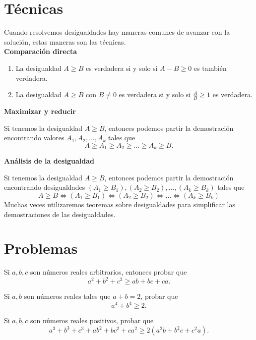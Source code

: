 \documentclass[12pt]{article}
\begin{document}
    \section{Técnicas}
    Cuando resolvemos desigualdades hay maneras comunes de avanzar con la solución, estas maneras son las técnicas.\\

    \textbf{Comparación directa}
    \begin{enumerate}
        \item La desigualdad $A \geq B$ es verdadera si y solo si $A - B \geq 0$ es también verdadera.
        \item La desigualdad $A \geq B$ con $B \neq 0$ es verdadera si y solo si $\frac{A}{B} \geq 1$ es verdadera.
    \end{enumerate}

    \textbf{Maximizar y reducir}
    \par
    Si tenemos la desigualdad $A \geq B$, entonces podemos partir la demostración encontrando valores $A_1, A_2, \ldots, A_k$ tales que
    \[
        A \geq A_1 \geq A_2 \geq \ldots \geq A_k \geq B.
    \]

    \textbf{Análisis de la desigualdad}
    \par
    Si tenemos la desigualdad $A \geq B$, entonces podemos partir la demostración encontrando desigualdades $(A_1 \geq B_1), (A_2 \geq B_2), \ldots, (A_k \geq B_k)$ tales que
    \[
       A \geq B \iff (A_1 \geq B_1) \iff (A_2 \geq B_2) \iff \ldots \iff (A_k \geq B_k)
    \]
    Muchas veces utilizaremos teoremas sobre desigualdades para simplificar las demostraciones de las desigualdades.

    \section{Problemas}

    \begin{prob-without-section}
        Si $a,b,c$ son números reales arbitrarios, entonces probar que
        \[
            a^2 + b^2 + c^2 \geq ab + bc + ca.
        \]
    \end{prob-without-section}

    \begin{prob-without-section}
        Si $a,b$ son números reales tales que $a + b = 2$, probar que
        \[
            a^4 + b^4 \geq 2.
        \]
    \end{prob-without-section}

    \begin{prob-without-section}
        Si $a,b,c$ son números reales positivos, probar que
        \[
            a^3 + b^3 + c^3 + ab^2 + bc^2 + ca^2 \geq 2(a^2b + b^2 c + c^2 a).
        \]
    \end{prob-without-section}
\end{document}

